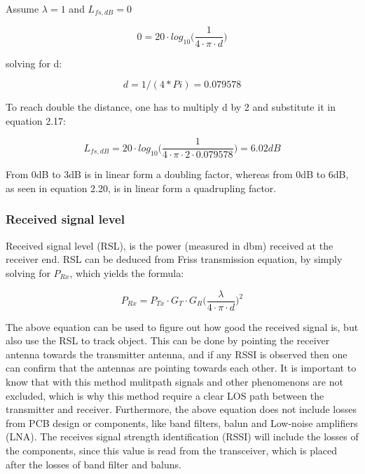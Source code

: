 Assume $\lambda = 1$ and $L_{fs,dB} = 0$

\begin{equation}
    0 = 20 \cdot log_{10}\Big(\frac{1}{4 \cdot \pi \cdot d}\Big)
\end{equation}

solving for d:

\begin{equation}
    d = 1/(4*Pi) = 0.079578
\end{equation}

To reach double the distance, one has to multiply d by 2 and substitute it in equation 2.17:

\begin{equation}
   L_{fs,dB} = 20 \cdot log_{10}\Big(\frac{1}{4 \cdot \pi \cdot 2 \cdot 0.079578}\Big) = 6.02dB 
\end{equation}

From 0dB to 3dB is in linear form a doubling factor, whereas from 0dB to 6dB, as seen in equation 2.20, is in linear form a quadrupling factor.


\subsubsection{Received signal level}
Received signal level (RSL), is the power (measured in dbm) received at the receiver end. RSL can be deduced from Friss transmission equation, by simply solving for $P_{Rx}$, which yields the formula:

\begin{equation}
    P_{Rx} = P_{Tx} \cdot G_T \cdot G_R \Big( \frac{\lambda}{4 \cdot \pi \cdot d} \Big)^2
\end{equation}

The above equation can be used to figure out how good the received signal is, but also use the RSL to track object. This can be done by pointing the receiver antenna towards the transmitter antenna, and if any RSSI is observed then one can confirm that the antennas are pointing towards each other. It is important to know that with this method mulitpath signals and other phenomenons are not excluded, which is why this method require a clear LOS path between the transmitter and receiver. Furthermore, the above equation does not include losses from PCB design or components, like band filters, balun and Low-noise amplifiers (LNA). The receives signal strength identification (RSSI) will include the losses of the components, since this value is read from the transceiver, which is placed after the losses of band filter and baluns.    

